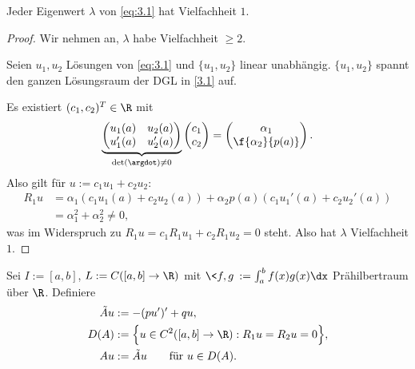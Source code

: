 \begin{st} \label{3.8}
	Jeder Eigenwert $\lambda$ von \eqref{eq:3.1} hat Vielfachheit $1$.
	\begin{proof}
		Wir nehmen an, $\lambda$ habe Vielfachheit $\ge 2$.

		Seien $u_1, u_2$ Lösungen von \eqref{eq:3.1} und $\{u_1,u_2\}$ linear unabhängig.
		$\{u_1,u_2\}$ spannt den ganzen Lösungsraum der DGL in \eqref{3.1} auf.

		Es existiert $(c_1,c_2)^T \in \R$ mit
		\[
			\underbrace{\begin{pmatrix}
				u_1(a) & u_2(a) \\
				u_1'(a) & u_2'(a)
			\end{pmatrix}}_{\det(\argdot) \neq 0}
			\begin{pmatrix}
				c_1 \\ c_2
			\end{pmatrix}
			= \begin{pmatrix}
				\alpha_1 \\ \f{\alpha_2}{p(a)}
			\end{pmatrix}.
		\]
		Also gilt für $u:= c_1u_1 + c_2 u_2$:
		\begin{align*}
			R_1 u &= \alpha_1(c_1u_1(a) + c_2u_2(a)) + \alpha_2 p(a) (c_1u_1'(a) + c_2u_2'(a)) \\
			&= \alpha_1^2 + \alpha_2^2
			\neq 0,
		\end{align*}
		was im Widerspruch zu $R_1u = c_1R_1u_1 + c_2R_1u_2 = 0$ steht.
		Also hat $\lambda$ Vielfachheit $1$.
	\end{proof}
\end{st}

\begin{df} \label{3.9}
	Sei $I := [a,b]$, $L := C([a,b] \to \R)$ mit $\<f,g\> := \int_a^b f(x)g(x) \dx$ Prähilbertraum über $\R$.
	Definiere
	\begin{align}
		\label{eq:3.2}
		\begin{aligned}
			\tilde A u &:= -(pu')' + qu, \\
			D(A) &:= \Big\{ u \in C^2([a,b] \to \R) : R_1u = R_2u = 0 \Big\}, \\
			Au &:= \tilde A u \qquad \text{für $u\in D(A)$}.
		\end{aligned}
	\end{align}
\end{df}

